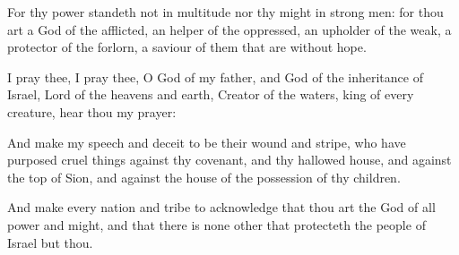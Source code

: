 {\par }{\PP {}For thy power standeth not in multitude nor thy might in strong men: for thou art a God of the afflicted, an helper of the oppressed, an upholder of the weak, a protector of the forlorn, a saviour of them that are without hope.
\par }{\PP {}I pray thee, I pray thee, O God of my father, and God of the inheritance of Israel, Lord of the heavens and earth, Creator of the waters, king of every creature, hear thou my prayer:
\par }{\PP {}And make my speech and deceit to be their wound and stripe, who have purposed cruel things against thy covenant, and thy hallowed house, and against the top of Sion, and against the house of the possession of thy children.
\par }{\PP {}And make every nation and tribe to acknowledge that thou art the God of all power and might, and that there is none other that protecteth the people of Israel but thou.

}
